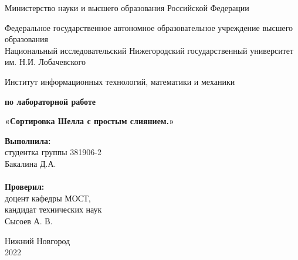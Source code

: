 \documentclass{report}
\begin{document}
\begin{titlepage}

\begin{center}
Министерство науки и высшего образования Российской Федерации
\end{center}

\begin{center}
Федеральное государственное автономное образовательное учреждение высшего образования \\
Национальный исследовательский Нижегородский государственный университет им. Н.И. Лобачевского
\end{center}

\begin{center}
Институт информационных технологий, математики и механики
\end{center}

\vspace{4em}

\begin{center}
\textbf{ по лабораторной работе} \\
\end{center}
\begin{center}
\textbf{\Large«Сортировка Шелла с простым слиянием.»} \\
\end{center}

\vspace{4em}

\newbox{\lbox}
\newlength{\maxl}
\setlength{\maxl}{\wd\lbox}
\hfill\parbox{7cm}{
\hspace*{5cm}\hspace*{-5cm}\textbf{Выполнила:} \\ студентка группы 381906-2 \\ Бакалина Д.А.\\
\\
\hspace*{5cm}\hspace*{-5cm}\textbf{Проверил:}\\ доцент кафедры МОСТ, \\ кандидат технических наук \\ Сысоев А. В.\\
}
\vspace{\fill}

\begin{center} Нижний Новгород \\ 2022 \end{center}

\end{titlepage}
\end{document}
